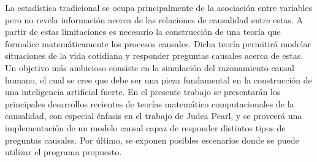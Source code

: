 \begin{spanish_abstract}
	La estadística tradicional se ocupa principalmente de la asociación entre variables pero no revela información acerca de las relaciones de causalidad entre estas. A partir de estas limitaciones es necesario la construcción de una teoría que formalice matemáticamente los procesos causales. Dicha teoría permitirá modelar situaciones de la vida cotidiana y responder preguntas causales acerca de estas. Un objetivo más ambicioso consiste en la simulación del razonamiento causal humano, el cual se cree que debe ser una pieza fundamental en la construcción de una inteligencia artificial fuerte. En el presente trabajo se presentarán los principales desarrollos recientes de teorías matemático computacionales de la causalidad, con especial énfasis en el trabajo de Judea Pearl, y se proveerá una implementación de un modelo causal capaz de responder distintos tipos de preguntas causales. Por último, se exponen posibles escenarios donde se puede utilizar el programa propuesto.
\end{spanish_abstract}

